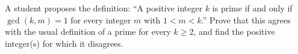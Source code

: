 A student proposes the definition: ``A positive integer $k$ is prime if and only if $\gcd(k,m)=1$ for every integer $m$ with $1<m<k$.'' Prove that this agrees with the usual definition of a prime for every $k\ge2$, and find the positive integer(s) for which it disagrees.
